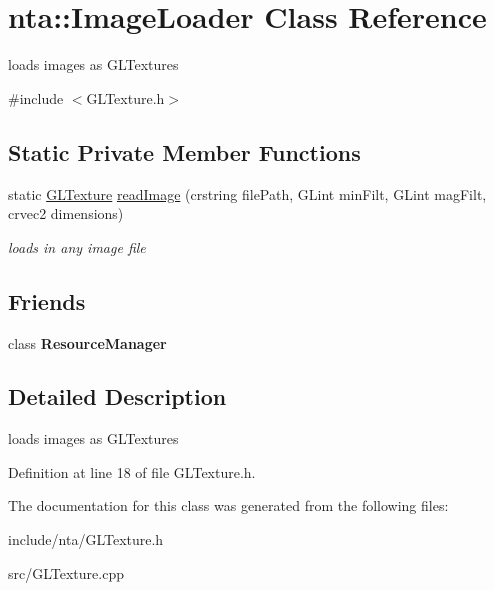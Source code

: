 \hypertarget{classnta_1_1ImageLoader}{}\section{nta\+:\+:Image\+Loader Class Reference}
\label{classnta_1_1ImageLoader}


loads images as G\+L\+Textures  




{\ttfamily \#include $<$G\+L\+Texture.\+h$>$}

\subsection*{Static Private Member Functions}
\begin{DoxyCompactItemize}
\item 
\mbox{\label{classnta_1_1ImageLoader_a9144fea6007e8dc1af75ee4da5a02f10}} 
static \hyperlink{namespacenta_d3/dff/structnta_1_1GLTexture}{G\+L\+Texture} \hyperlink{classnta_1_1ImageLoader_a9144fea6007e8dc1af75ee4da5a02f10}{read\+Image} (crstring file\+Path, G\+Lint min\+Filt, G\+Lint mag\+Filt, crvec2 dimensions)
\begin{DoxyCompactList}\small\item\em loads in any image file \end{DoxyCompactList}\end{DoxyCompactItemize}
\subsection*{Friends}
\begin{DoxyCompactItemize}
\item 
\mbox{\label{classnta_1_1ImageLoader_a54c1252abc87a78a301e6b6984470408}} 
class {\bfseries Resource\+Manager}
\end{DoxyCompactItemize}


\subsection{Detailed Description}
loads images as G\+L\+Textures 

Definition at line 18 of file G\+L\+Texture.\+h.



The documentation for this class was generated from the following files\+:\begin{DoxyCompactItemize}
\item 
include/nta/G\+L\+Texture.\+h\item 
src/G\+L\+Texture.\+cpp\end{DoxyCompactItemize}
